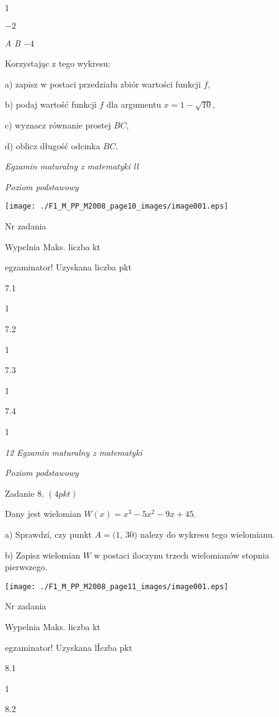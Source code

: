 \documentclass[a4paper,12pt]{article}
\begin{document}
1

$-2$

{\it A  B}  $-4$

Korzystając z tego wykresu:

a) zapisz w postaci przedziału zbiór wartości funkcji $f,$

b) podaj wartość funkcji $f$ dla argumentu $x=1-\sqrt{10},$

c) wyznacz równanie prostej $BC,$

d) oblicz długość odcinka $BC.$





{\it Egzamin maturalny z matematyki ll}

{\it Poziom podstawowy}
\begin{center}
\texttt{[image: ./F1\_M\_PP\_M2008\_page10\_images/image001.eps]}
\end{center}
Nr zadania

Wypelnia Maks. liczba kt

egzaminator! Uzyskana liczba pkt

7.1

1

7.2

1

7.3

1

7.4

1





{\it 12 Egzamin maturalny z matematyki}

{\it Poziom podstawowy}

Zadanie 8. $(4pkt)$

Dany jest wielomian $W(x)=x^{3}-5x^{2}-9x+45.$

a) Sprawdzí, czy punkt $A=(1$, 30$)$ nalezy do wykresu tego wielomianu.

b) Zapisz wielomian $W$ w postaci iloczynu trzech wielomianów stopnia pierwszego.
\begin{center}
\texttt{[image: ./F1\_M\_PP\_M2008\_page11\_images/image001.eps]}
\end{center}
Nr zadania

Wypelnia Maks. liczba kt

egzaminator! Uzyskana lÍczba pkt

8.1

1

8.2
\end{document}
